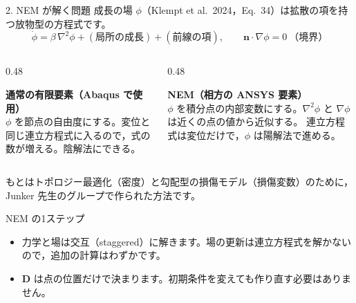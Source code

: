 \documentclass[aspectratio=169,11pt]{beamer}
\begin{document}
\begin{frame}{2. NEM が解く問題}
成長の場 $\phi$（Klempt et al.\ 2024，Eq.\ 34）は拡散の項を持つ放物型の方程式です。
\[
  \dot\phi=\beta\,\nabla^2\phi+(\text{局所の成長})+(\text{前線の項}),\qquad
  \mathbf n\cdot\nabla\phi=0\ \text{（境界）}
\]
\vspace{-4pt}
\begin{columns}[T]
\begin{column}{0.48\textwidth}
\colorbox{gray!12}{\parbox{0.95\linewidth}{\small
\textbf{通常の有限要素（Abaqus で使用）}\\[2pt]
$\phi$ を節点の自由度にする。変位と同じ連立方程式に入るので，式の数が増える。陰解法にできる。}}
\end{column}
\begin{column}{0.48\textwidth}
\colorbox{c3!12}{\parbox{0.95\linewidth}{\small
\textbf{NEM（相方の ANSYS 要素）}\\[2pt]
$\phi$ を積分点の内部変数にする。$\nabla^2\phi$ と $\nabla\phi$ は近くの点の値から近似する。
連立方程式は変位だけで，$\phi$ は陽解法で進める。}}
\end{column}
\end{columns}
\vspace{8pt}
{\small もとはトポロジー最適化（密度）と勾配型の損傷モデル（損傷変数）のために，Junker 先生のグループで作られた方法です。}
\end{frame}

\begin{frame}{NEM の1ステップ}
\centering
{}

\vspace{10pt}
\begin{itemize}\small
  \item 力学と場は交互（staggered）に解きます。場の更新は連立方程式を解かないので，追加の計算はわずかです。
  \item $\mathbf D$ は点の位置だけで決まります。初期条件を変えても作り直す必要はありません。
\end{itemize}
\end{frame}
\end{document}
